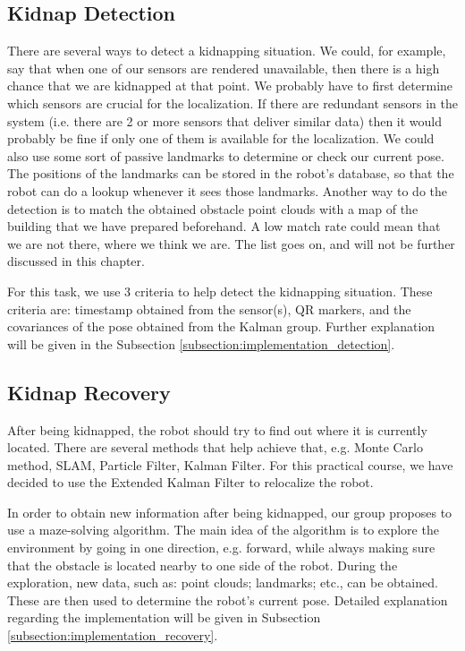 \subsection{Kidnap Detection} \label{subsection:concept_detection}
There are several ways to detect a kidnapping situation. We could, for example, say that when one of our sensors are rendered unavailable, then there is a high chance that we are kidnapped at that point. We probably have to first determine which sensors are crucial for the localization. If there are redundant sensors in the system (i.e. there are 2 or more sensors that deliver similar data) then it would probably be fine if only one of them is available for the localization. We could also use some sort of passive landmarks to determine or check our current pose. The positions of the landmarks can be stored in the robot's database, so that the robot can do a lookup whenever it sees those landmarks. Another way to do the detection is to match the obtained obstacle point clouds with a map of the building that we have prepared beforehand. A low match rate could mean that we are not there, where we think we are. The list goes on, and will not be further discussed in this chapter.

For this task, we use 3 criteria to help detect the kidnapping situation. These criteria are: timestamp obtained from the sensor(s), QR markers, and the covariances of the pose obtained from the Kalman group. Further explanation will be given in the Subsection \ref{subsection:implementation_detection}. 

\subsection{Kidnap Recovery} \label{subsection:concept_recovery}

After being kidnapped, the robot should try to find out where it is currently located. There are several methods that help achieve that, e.g. Monte Carlo method, SLAM, Particle Filter, Kalman Filter. For this practical course, we have decided to use the Extended Kalman Filter to relocalize the robot.

In order to obtain new information after being kidnapped, our group proposes to use a maze-solving algorithm. The main idea of the algorithm is to explore the environment by going in one direction, e.g. forward, while always making sure that the obstacle is located nearby to one side of the robot. During the exploration, new data, such as: point clouds; landmarks; etc., can be obtained. These are then used to determine the robot's current pose. Detailed explanation regarding the implementation will be given in Subsection \ref{subsection:implementation_recovery}.


